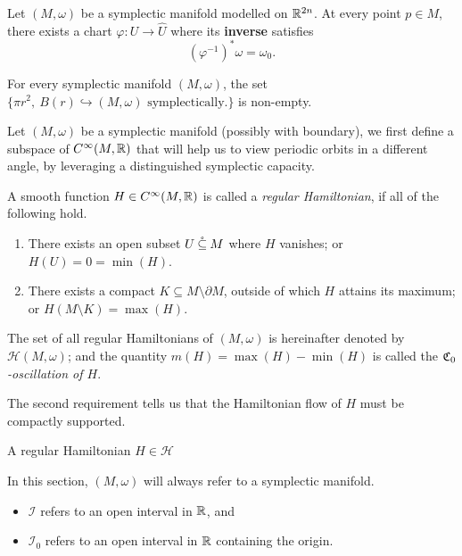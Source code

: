 \documentclass[../main-v2-manifolds.tex]{subfiles}
\begin{document}
\begin{wts}\label{wts:darbouxs theorem}
    Let $(M,\omega)$ be a symplectic manifold modelled on ${\mathbb{R}^{2n}}$. At every point $p\in M$, there exists a chart $\varphi: U\to\hat{U}$ where its \textbf{inverse} satisfies
    \[
        (\varphi^{-1})^*\omega = \omega_0.
    \]
\end{wts}
\begin{corollary}
    For every symplectic manifold $(M,\omega)$, the set $\{\pi r^2, \: B(r)\hookrightarrow (M,\omega) \text{ symplectically.}\}$ is non-empty.
\end{corollary}
Let $(M,\omega)$ be a symplectic manifold (possibly with boundary), we first define a subspace of $C^\infty(M,\mathbb{R})$ that will help us to view periodic orbits in a different angle, by leveraging a distinguished symplectic capacity.
\begin{definition}\label{def:regular hamiltonians}
    A smooth function $H\in C^\infty(M,\mathbb{R})$ is called a \emph{regular Hamiltonian}, if all of the following hold.
    \begin{enumerate}
        \item There exists an open subset $U\:\mathring{\subseteq}\: M$ where $H$ vanishes; or $H(U) = 0=\min(H)$.
        \item There exists a compact $K\subseteq M\setminus \partial M$, outside of which $H$ attains its maximum; or $H(M\setminus K) = \max(H)$.
    \end{enumerate}
    The set of all regular Hamiltonians of $(M,\omega)$ is hereinafter denoted by $\mathcal{H}(M,\omega)$; and the quantity $m(H) = \max(H) - \min(H)$ is called the \emph{$\mathfrak{C}_0$-oscillation of $H$}.
\end{definition}
The second requirement tells us that the Hamiltonian flow of $H$ must be compactly supported.
\begin{definition}\label{def:admissable hamiltonians}
    A regular Hamiltonian $H\in\mathcal{H}$
\end{definition}
%
%
%
%
%
%
In this section, $(M,\omega)$ will always refer to a symplectic manifold.
\begin{remark}
    \begin{itemize}
        \item $\mathcal{I}$ refers to an open interval in $\mathbb{R}$, and
        \item $\mathcal{I}_0$ refers to an open interval in $\mathbb{R}$ containing the origin.
    \end{itemize}
\end{remark}
\end{document}
